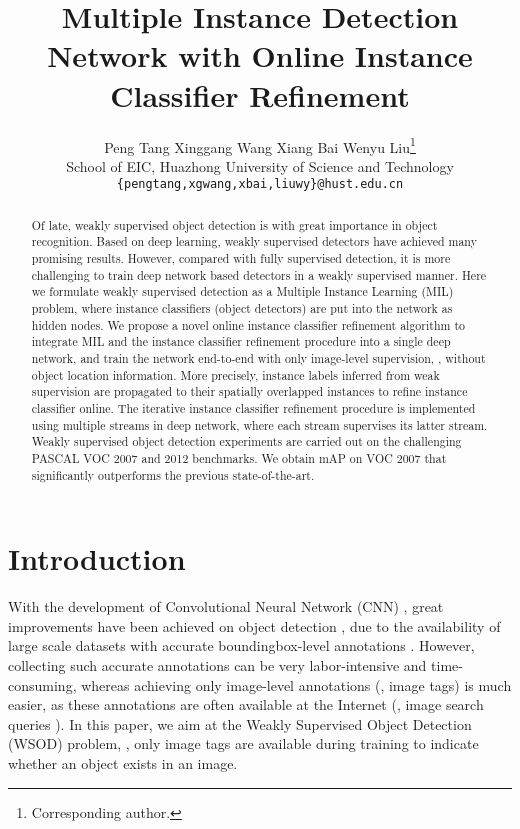 \documentclass[10pt,twocolumn,letterpaper]{article}
\begin{document}
\title{Multiple Instance Detection Network with Online Instance Classifier Refinement}

\author{Peng Tang
\quad
Xinggang Wang
\quad
Xiang Bai
\quad
Wenyu Liu\thanks{Corresponding author.}\\
School of EIC, Huazhong University of Science and Technology\\
{\tt\small \{pengtang,xgwang,xbai,liuwy\}@hust.edu.cn}
}

\maketitle


\begin{abstract}
   Of late, weakly supervised object detection is with great importance in object recognition.
   Based on deep learning, weakly supervised detectors have achieved many promising results.
   However, compared with fully supervised detection, it is more challenging to train deep network based detectors in a weakly supervised manner.
   Here we formulate weakly supervised detection as a Multiple Instance Learning (MIL) problem, where instance classifiers (object detectors) are put into the network as hidden nodes.
   We propose a novel online instance classifier refinement algorithm to integrate MIL and the instance classifier refinement procedure into a single deep network, and train the network end-to-end with only image-level supervision, \ie, without object location information.
   More precisely, instance labels inferred from weak supervision are propagated to their spatially overlapped instances to refine instance classifier online.
   The iterative instance classifier refinement procedure is implemented using multiple streams in deep network, where each stream supervises its latter stream.
   Weakly supervised object detection experiments are carried out on the challenging PASCAL VOC 2007 and 2012 benchmarks.
   We obtain  mAP on VOC 2007 that significantly outperforms the previous state-of-the-art.
\end{abstract}



\section{Introduction}
\label{sec:intro}

With the development of Convolutional Neural Network (CNN) \cite{Ref:Krizhevsky2012,Ref:Lecun1998}, great improvements have been achieved on object detection \cite{Ref:Girshick2015,Ref:Girshick2016,Ref:Liu2016,Ref:Redmon2016,Ref:Ren2015}, due to the availability of large scale datasets with accurate boundingbox-level annotations \cite{Ref:Deng2009,Ref:Everingham2010,Ref:Lin2014}.
However, collecting such accurate annotations can be very labor-intensive and time-consuming, whereas achieving only image-level annotations (\ie, image tags) is much easier, as these annotations are often available at the Internet (\eg, image search queries \cite{Ref:Li2013}).
In this paper, we aim at the Weakly Supervised Object Detection (WSOD) problem, \ie, only image tags are available during training to indicate whether an object exists in an image.
\end{document}
